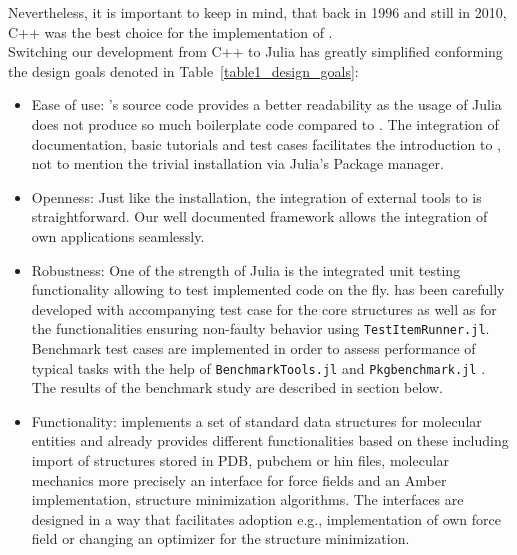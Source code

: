 Nevertheless, it is important to keep in mind, that back in 1996 and still in 2010, C++ was the best choice for the implementation of \ball. \\
Switching our development from C++ to Julia has greatly simplified conforming the design goals denoted in Table~\ref{table1_design_goals}: 
\begin{itemize}
	\item Ease of use: \biochem's source code provides a better readability  as the usage of Julia does not produce so much boilerplate code compared to \ball. The integration of documentation, basic tutorials and test cases facilitates the introduction to \biochem, not to mention the trivial installation via Julia's Package manager. 
	
	\item Openness: Just like the installation, the integration of external tools to \biochem is straightforward. Our well documented framework allows the integration of own applications seamlessly. 
	
	\item Robustness: One of the strength of Julia is the integrated unit testing functionality allowing to test implemented code on the fly. \biochem has been carefully developed with accompanying test case for the core structures as well as for the functionalities ensuring non-faulty behavior using \texttt{TestItemRunner.jl}\cite{TestItemRunner}. Benchmark test cases are implemented in order to assess performance of typical tasks with the help of \texttt{BenchmarkTools.jl} and \texttt{Pkgbenchmark.jl} \cite{BenchmarkTools.jl-2016, PkgBenchmark}. The results of the benchmark study are described in section below. 
	
	\item Functionality: \biochem implements a set of standard data structures for molecular entities and already provides different functionalities based on these including import of structures stored in PDB, pubchem or hin files, molecular mechanics more precisely an interface for force fields and an Amber implementation, structure minimization algorithms. The interfaces are designed in a way that facilitates adoption e.g., implementation of own force field or changing an optimizer for the structure minimization. 
\end{itemize}

